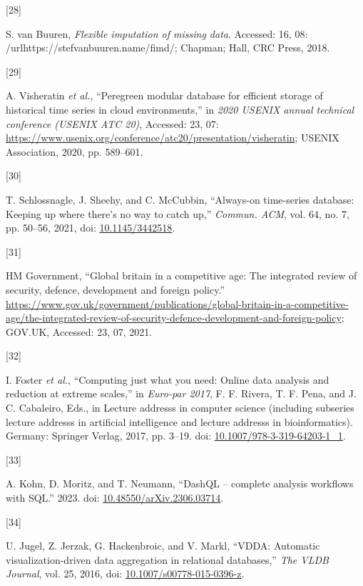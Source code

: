 \documentclass{article}
\newlength{\cslhangindent}
\newlength{\csllabelwidth}
\newlength{\cslentryspacingunit} %
\newenvironment{CSLReferences}[2] %
 {%
  \setlength{\parindent}{0pt}
  \ifodd #1
  \let\oldpar\par
  \def\par{\hangindent=\cslhangindent\oldpar}
  \fi
  \setlength{\parskip}{#2\cslentryspacingunit}
 }%
 {}
\newcommand{\CSLLeftMargin}[1]{\parbox[t]{\csllabelwidth}{#1}}
\newcommand{\CSLRightInline}[1]{\parbox[t]{\linewidth - \csllabelwidth}{#1}\break}
\begin{document}
\begin{CSLReferences}{0}{0}
\leavevmode{}%
\CSLLeftMargin{{[}28{]} }
\CSLRightInline{S. van Buuren, \emph{Flexible imputation of missing
data}. Accessed: 16, 08: /url{https://stefvanbuuren.name/fimd/};
Chapman; Hall, CRC Press, 2018.}

\leavevmode{}%
\CSLLeftMargin{{[}29{]} }
\CSLRightInline{A. Visheratin \emph{et al.}, {``Peregreen {\textendash}
modular database for efficient storage of historical time series in
cloud environments,''} in \emph{2020 USENIX annual technical conference
(USENIX ATC 20)}, Accessed: 23, 07:
\url{https://www.usenix.org/conference/atc20/presentation/visheratin};
USENIX Association, 2020, pp. 589--601.}

\leavevmode{}%
\CSLLeftMargin{{[}30{]} }
\CSLRightInline{T. Schlossnagle, J. Sheehy, and C. McCubbin,
{``Always-on time-series database: Keeping up where there's no way to
catch up,''} \emph{Commun. ACM}, vol. 64, no. 7, pp. 50--56, 2021, doi:
\href{https://doi.org/10.1145/3442518}{10.1145/3442518}.}

\leavevmode{}%
\CSLLeftMargin{{[}31{]} }
\CSLRightInline{HM Government, {``Global britain in a competitive age:
The integrated review of security, defence, development and foreign
policy.''}
\url{https://www.gov.uk/government/publications/global-britain-in-a-competitive-age/the-integrated-review-of-security-defence-development-and-foreign-policy};
GOV.UK, Accessed: 23, 07, 2021.}

\leavevmode{}%
\CSLLeftMargin{{[}32{]} }
\CSLRightInline{I. Foster \emph{et al.}, {``Computing just what you
need: Online data analysis and reduction at extreme scales,''} in
\emph{Euro-par 2017}, F. F. Rivera, T. F. Pena, and J. C. Cabaleiro,
Eds., in Lecture addresss in computer science (including subseries
lecture addresss in artificial intelligence and lecture addresss in
bioinformatics). Germany: Springer Verlag, 2017, pp. 3--19. doi:
\href{https://doi.org/10.1007/978-3-319-64203-1_1}{10.1007/978-3-319-64203-1\_1}.}

\leavevmode{}%
\CSLLeftMargin{{[}33{]} }
\CSLRightInline{A. Kohn, D. Moritz, and T. Neumann, {``DashQL --
complete analysis workflows with SQL.''} 2023. doi:
\href{https://doi.org/10.48550/arXiv.2306.03714}{10.48550/arXiv.2306.03714}.}

\leavevmode{}%
\CSLLeftMargin{{[}34{]} }
\CSLRightInline{U. Jugel, Z. Jerzak, G. Hackenbroic, and V. Markl,
{``VDDA: Automatic visualization-driven data aggregation in relational
databases,''} \emph{The VLDB Journal}, vol. 25, 2016, doi:
\href{https://doi.org/10.1007/s00778-015-0396-z}{10.1007/s00778-015-0396-z}.}


\end{CSLReferences}
\end{document}
